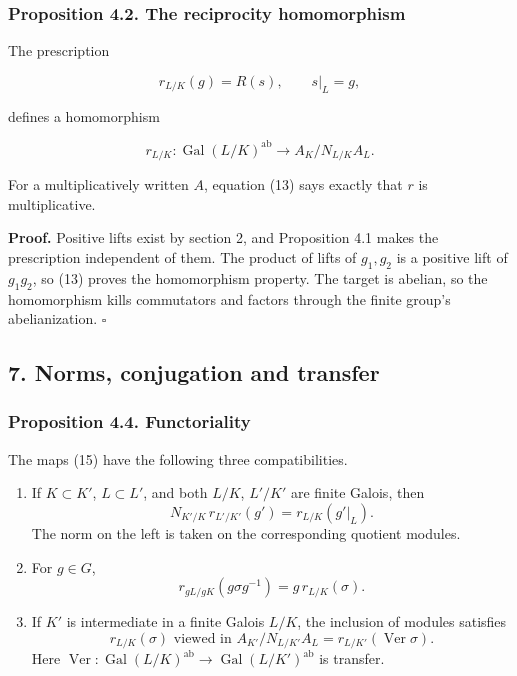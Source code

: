 \documentclass[11pt,a4paper]{article}
\newcommand{\tightlist}{\setlength{\itemsep}{0pt}\setlength{\parskip}{0pt}}
\begin{document}
\subsubsection{Proposition 4.2. The reciprocity
homomorphism}\label{proposition-4.2.-the-reciprocity-homomorphism}

The prescription

\[
r_{L/K}(g)=R(s),\qquad s|_L=g,
\]

defines a homomorphism

\[
r_{L/K}:\operatorname{Gal}(L/K)^{\mathrm{ab}}
\longrightarrow A_K/N_{L/K}A_L.
\tag{15}
\]

For a multiplicatively written \(A\), equation (13) says exactly that
\(r\) is multiplicative.

\textbf{Proof.} Positive lifts exist by section 2, and Proposition 4.1
makes the prescription independent of them. The product of lifts of
\(g_1,g_2\) is a positive lift of \(g_1g_2\), so (13) proves the
homomorphism property. The target is abelian, so the homomorphism kills
commutators and factors through the finite group's abelianization.
\(\square\)

\subsection{7. Norms, conjugation and
transfer}\label{norms-conjugation-and-transfer}

\subsubsection{Proposition 4.4.
Functoriality}\label{proposition-4.4.-functoriality}

The maps (15) have the following three compatibilities.

\begin{enumerate}
\def\labelenumi{\arabic{enumi}.}
\tightlist
\item
  If \(K\subset K'\), \(L\subset L'\), and both \(L/K\), \(L'/K'\) are
  finite Galois, then \[
  N_{K'/K}\,r_{L'/K'}(g')=r_{L/K}(g'|_L).
  \tag{16}
  \] The norm on the left is taken on the corresponding quotient
  modules.
\item
  For \(g\in G\), \[
  r_{gL/gK}(g\sigma g^{-1})=g\,r_{L/K}(\sigma).
  \tag{17}
  \]
\item
  If \(K'\) is intermediate in a finite Galois \(L/K\), the inclusion of
  modules satisfies \[
  r_{L/K}(\sigma)\text{ viewed in }A_{K'}/N_{L/K'}A_L
  =r_{L/K'}(\operatorname{Ver}\sigma).
  \tag{18}
  \] Here \(\operatorname{Ver}:\operatorname{Gal}(L/K)^{\mathrm{ab}}\to
  \operatorname{Gal}(L/K')^{\mathrm{ab}}\) is transfer.
\end{enumerate}
\end{document}
